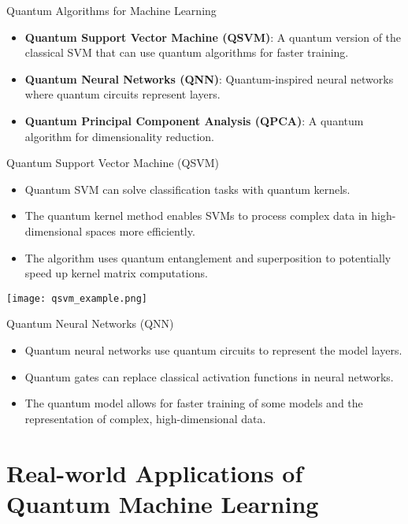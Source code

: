 \documentclass{beamer}
\begin{document}
\begin{frame}{Quantum Algorithms for Machine Learning}
    \begin{itemize}
        \item \textbf{Quantum Support Vector Machine (QSVM)}: A quantum version of the classical SVM that can use quantum algorithms for faster training.
        \item \textbf{Quantum Neural Networks (QNN)}: Quantum-inspired neural networks where quantum circuits represent layers.
        \item \textbf{Quantum Principal Component Analysis (QPCA)}: A quantum algorithm for dimensionality reduction.
    \end{itemize}
\end{frame}

\begin{frame}{Quantum Support Vector Machine (QSVM)}
    \begin{itemize}
        \item Quantum SVM can solve classification tasks with quantum kernels.
        \item The quantum kernel method enables SVMs to process complex data in high-dimensional spaces more efficiently.
        \item The algorithm uses quantum entanglement and superposition to potentially speed up kernel matrix computations.
    \end{itemize}
    \begin{center}
        \texttt{[image: qsvm\_example.png]} %
    \end{center}
\end{frame}

\begin{frame}{Quantum Neural Networks (QNN)}
    \begin{itemize}
        \item Quantum neural networks use quantum circuits to represent the model layers.
        \item Quantum gates can replace classical activation functions in neural networks.
        \item The quantum model allows for faster training of some models and the representation of complex, high-dimensional data.
    \end{itemize}
\end{frame}

\section{Real-world Applications of Quantum Machine Learning}
\end{document}
